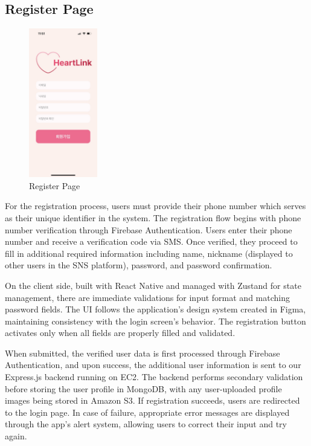 \documentclass[conference]{IEEEtran}
\begin{document}
   \subsection{Register Page}
        \begin{figure}[htbp]
            \centerline{\includegraphics[width=3cm]{Images/page/register.jpg}}
            \caption{Register Page}
            \label{fig}
        \end{figure}
        For the registration process, users must provide their phone number which serves as their unique identifier in the system. The registration flow begins with phone number verification through Firebase Authentication. Users enter their phone number and receive a verification code via SMS. Once verified, they proceed to fill in additional required information including name, nickname (displayed to other users in the SNS platform), password, and password confirmation.

        On the client side, built with React Native and managed with Zustand for state management, there are immediate validations for input format and matching password fields. The UI follows the application's design system created in Figma, maintaining consistency with the login screen's behavior. The registration button activates only when all fields are properly filled and validated.

        When submitted, the verified user data is first processed through Firebase Authentication, and upon success, the additional user information is sent to our Express.js backend running on EC2. The backend performs secondary validation before storing the user profile in MongoDB, with any user-uploaded profile images being stored in Amazon S3. If registration succeeds, users are redirected to the login page. In case of failure, appropriate error messages are displayed through the app's alert system, allowing users to correct their input and try again.
\end{document}
